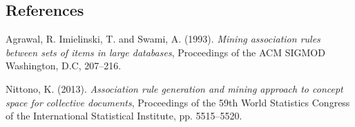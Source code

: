 \documentclass[12pt]{article}
\begin{document}
%        
%
%        

\subsection*{References}

\begin{description}

\item
Agrawal, R. Imielinski, T. and Swami, A. (1993).
\textit{Mining association rules between sets of items in large databases},
Proceedings of the ACM SIGMOD Washington, D.C, 207--216.

\item
Nittono, K. (2013).
\textit{Association rule generation and mining approach to concept space for collective documents},
Proceedings of the 59th World Statistics Congress of the International Statistical Institute, pp. 5515--5520.

\end{description}
\end{document}
